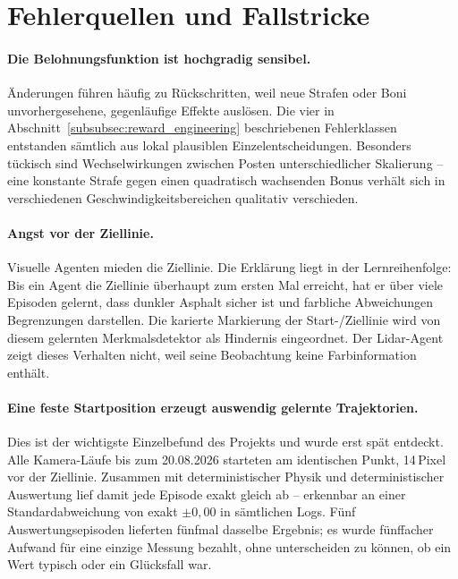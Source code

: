\section{Fehlerquellen und Fallstricke}
\label{subsec:fallen_phase1}

\paragraph{Die Belohnungsfunktion ist hochgradig sensibel.}
Änderungen führen häufig zu Rückschritten, weil neue Strafen oder Boni unvorhergesehene, gegenläufige Effekte auslösen. Die vier in Abschnitt~\ref{subsubsec:reward_engineering} beschriebenen Fehlerklassen entstanden sämtlich aus lokal plausiblen Einzelentscheidungen. Besonders tückisch sind Wechselwirkungen zwischen Posten unterschiedlicher Skalierung -- eine konstante Strafe gegen einen quadratisch wachsenden Bonus verhält sich in verschiedenen Geschwindigkeitsbereichen qualitativ verschieden.

\paragraph{Angst vor der Ziellinie.}
Visuelle Agenten mieden die Ziellinie. Die Erklärung liegt in der Lernreihenfolge: Bis ein Agent die Ziellinie überhaupt zum ersten Mal erreicht, hat er über viele Episoden gelernt, dass dunkler Asphalt sicher ist und farbliche Abweichungen Begrenzungen darstellen. Die karierte Markierung der Start-/Ziellinie wird von diesem gelernten Merkmalsdetektor als Hindernis eingeordnet. Der Lidar-Agent zeigt dieses Verhalten nicht, weil seine Beobachtung keine Farbinformation enthält.

\paragraph{Eine feste Startposition erzeugt auswendig gelernte Trajektorien.}
Dies ist der wichtigste Einzelbefund des Projekts und wurde erst spät entdeckt. Alle Kamera-Läufe bis zum 20.08.2026 starteten am identischen Punkt, \num{14}\,Pixel vor der Ziellinie. Zusammen mit deterministischer Physik und deterministischer Auswertung lief damit jede Episode exakt gleich ab -- erkennbar an einer Standardabweichung von exakt $\pm 0{,}00$ in sämtlichen Logs. Fünf Auswertungsepisoden lieferten fünfmal dasselbe Ergebnis; es wurde fünffacher Aufwand für eine einzige Messung bezahlt, ohne unterscheiden zu können, ob ein Wert typisch oder ein Glücksfall war.

